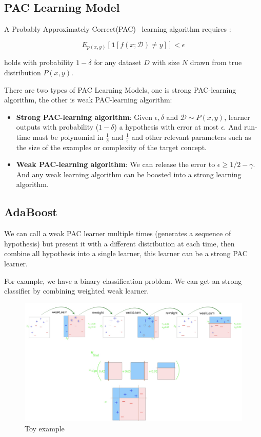 \documentclass[11pt]{article}
\begin{document}
\subsection{PAC Learning Model}

A Probably Approximately Correct(PAC)~\cite{valiant1984theory} learning algorithm requires :

\begin{equation}
E_{p(x, y)}[\mathbf{1}[f(x ; \mathcal{D}) \neq y]]<\epsilon
\end{equation}

holds with probability $1-\delta $ for any dataset $D$ with size $N$ drawn from true distribution $P(x,y)$.

There are two types of PAC Learning Models, one is strong PAC-learning algorithm, the other is weak PAC-learning algorithm:
\begin{itemize}
    \item \textbf{Strong PAC-learning algorithm}: Given $\epsilon, \delta$ and $\mathcal{D} \sim P(x, y)$,
learner outputs with probability ($1-\delta$) a hypothesis with error at most $\epsilon$. And run-time must be polynomial in $\frac{1}{\delta}$ and $\frac{1}{\epsilon}$  and other relevant parameters such as the size of the examples or complexity of the target concept.
    \item \textbf{Weak PAC-learning algorithm}: We can release the error to $\epsilon \geq 1 / 2-\gamma$. And any weak learning algorithm can be boosted into a strong learning algorithm.
\end{itemize}


\subsection{AdaBoost}

We can call a weak PAC learner multiple times (generates a sequence of hypothesis) but present
it with a different distribution at each time, then combine all hypothesis into a single learner, this learner can be a strong PAC learner. 

For example, we have a binary classification problem. We can get an strong classifier by combining weighted weak learner.
\begin{figure}[htbp]
    \centering
\includegraphics[width=15cm]{0D45E115-583C-4075-948D-8CB24B907D8E.png}
    \caption{Toy example}
    \label{fig:galaxy}
\end{figure} 
\end{document}
